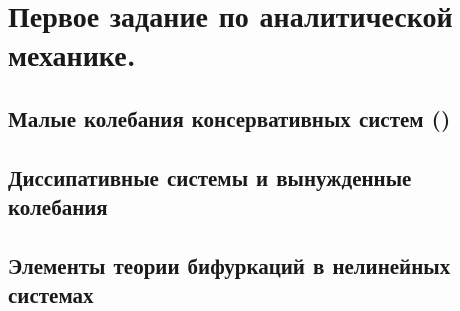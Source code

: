 



\section{Первое задание по аналитической механике.}


\subsection{Малые колебания консервативных систем \texorpdfstring{(\checkmark)}{(ок)}}



\subsection{Диссипативные системы и вынужденные колебания}



\subsection{Элементы теории бифуркаций в нелинейных системах}
